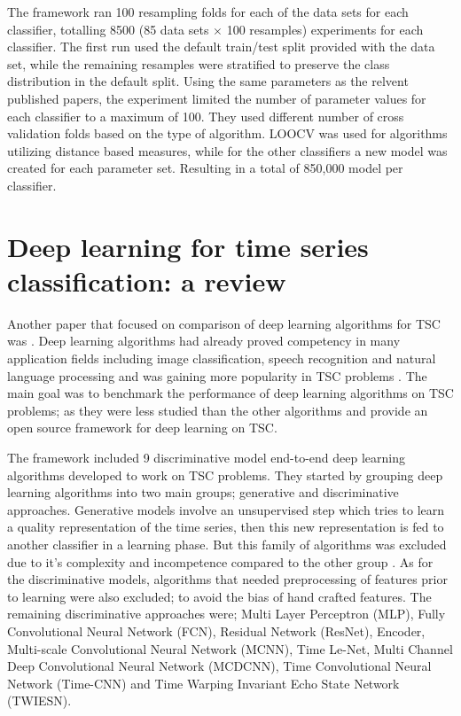 The framework ran 100 resampling folds for each of the data sets for each classifier, totalling 8500 (85 data sets $\times$ 100 resamples) experiments for each classifier.
The first run used the default train/test split provided with the data set, while the remaining resamples were stratified to preserve the class distribution in the default split.
Using the same parameters as the relvent published papers, the experiment limited the number of parameter values for each classifier to a maximum of 100.
They used different number of cross validation folds based on the type of algorithm. LOOCV was used for algorithms utilizing distance based measures,
while for the other classifiers a new model was created for each parameter set. Resulting in a total of 850,000 model per classifier.

\section{Deep learning for time series classification: a review}
\label{DeepLearningReview}
Another paper that focused on comparison of deep learning algorithms for TSC was \cite{fawaz2019deepreview}.
Deep learning algorithms had already proved competency in many application fields including image classification, speech recognition and natural language processing \cite{he2016deep,santos2016literature,krizhevsky2012imagenet,guan2019towards}
and was gaining more popularity in TSC problems \cite{zheng2014time,zheng2016exploiting,zhao2017convolutional}.
The main goal was to benchmark the performance of deep learning algorithms on TSC problems; as they were less studied than the other algorithms and provide an open source framework for deep learning on TSC.

The framework included 9 discriminative model end-to-end deep learning algorithms developed to work on TSC problems. They started by grouping deep learning algorithms into two main groups;
generative and discriminative approaches.
Generative models involve an unsupervised step which tries to learn a quality representation of the time series, then this new representation is fed to another classifier in a learning phase.
But this family of algorithms was excluded due to it's complexity and incompetence compared to the other group \cite{le2017time,bagnall2017great}.
As for the discriminative models, algorithms that needed preprocessing of features prior to learning were also excluded; to avoid the bias of hand crafted features.
The remaining discriminative approaches were; Multi Layer Perceptron (MLP), Fully Convolutional Neural Network (FCN), Residual Network (ResNet), Encoder, Multi-scale Convolutional Neural Network (MCNN),
Time Le-Net, Multi Channel Deep Convolutional Neural Network (MCDCNN), Time Convolutional Neural Network (Time-CNN) and Time Warping Invariant Echo State Network (TWIESN).

